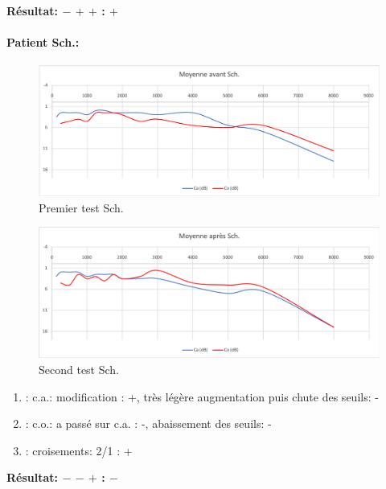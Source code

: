                 \textbf{ Résultat:  $- $  $+ $   $+ $     :   $+$}

\paragraph{Patient Sch.:}
\begin{figure}[th]
\centering
\includegraphics[width=1\linewidth]{images/graphiques/schaff_pre.png}
\caption[Patient Sch. : 1° test]{Premier test Sch.}

\end{figure}


         \begin{figure}[th]
\centering
\includegraphics[width=1\linewidth]{images/graphiques/schaff_post.png}
\caption[Patient Sch.: 2° test]{Second test Sch.}

\end{figure}


\begin{enumerate}
	
	\item : c.a.:  modification : +, très légère augmentation puis chute des
	seuils: -
	\item : c.o.: a passé sur c.a. : -, abaissement des seuils:  -
	\item : croisements: 2/1 :     +
\end{enumerate}
\textbf{ Résultat:  $-$    $-$   $+$         :   $-$ }

 \clearpage

